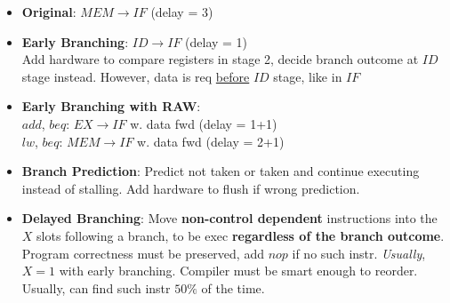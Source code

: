 \documentclass[a4paper,landscape]{article}
\begin{document}
\begin{multicols*}{4}
\begin{flatitemize}
\begin{itemize}
\item \textbf{Original}: $MEM \rightarrow IF$ (delay = 3)
\item \textbf{Early Branching}: $ID \rightarrow IF$ (delay = 1) \\
Add hardware to compare registers in stage 2, decide branch outcome at $ID$ stage instead. However, data is req \underline{before} $ID$ stage, like in $IF$
\item \textbf{Early Branching with RAW}: \\$add$, $beq$: $EX \rightarrow IF$ w. data fwd (delay = 1+1)\\
$lw$, $beq$: $MEM \rightarrow IF$ w. data fwd (delay = 2+1)
\item \textbf{Branch Prediction}: Predict not taken or taken and continue executing instead of stalling. Add hardware to flush if wrong prediction.
\item \textbf{Delayed Branching}: Move \textbf{non-control dependent} instructions into the $X$ slots following a branch, to be exec \textbf{regardless of the branch outcome}. Program correctness must be preserved, add $nop$ if no such instr. \textit{Usually}, $X=1$ with early branching. Compiler must be smart enough to reorder. Usually, can find such instr $50\%$ of the time.
\end{itemize}
\end{flatitemize}


\end{multicols*}
\end{document}
